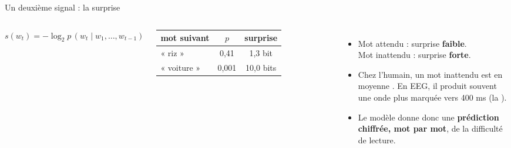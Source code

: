 \begin{frame}{Un deuxième signal : la surprise}
  \begin{columns}[c,onlytextwidth]
    \centering
    {\color{jaune}\large $\displaystyle s(w_t) = -\log_2 p\,(w_t \mid w_1,\dots,w_{t-1})$}\\[1.0em]
    \small
    \begin{tabular}{lcc}
      \toprule
      mot suivant & $p$ & surprise \\
      \midrule
      « riz » & 0{,}41 & \hphantom{0}1{,}3 bit \\
      « voiture » & 0{,}001 & 10{,}0 bits \\
      \bottomrule
    \end{tabular}
    \small
    \begin{itemize}
      \item<2-> Mot attendu : surprise \textbf{faible}.\\ Mot inattendu : surprise \textbf{forte}.
      \item<3-> Chez l'humain, un mot inattendu est en moyenne . En EEG, il produit souvent une onde plus marquée vers 400 ms (la ).
      \item<4-> Le modèle donne donc une \textbf{prédiction chiffrée, mot par mot}, de la difficulté de lecture.
    \end{itemize}
  \end{columns}
  \vspace{0.6em}
\end{frame}

